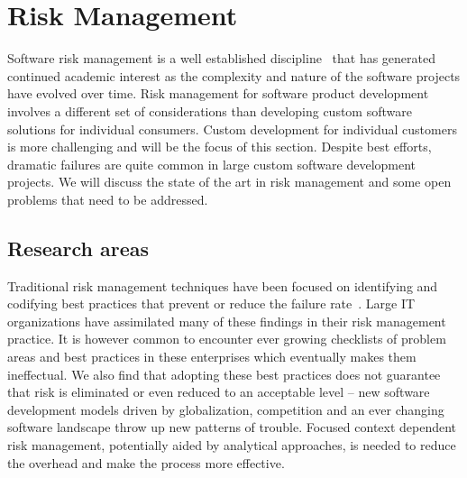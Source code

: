 \section{Risk Management}

Software risk management is a well established discipline~\cite{risk1,risk2} that has generated continued academic interest as the complexity and nature of the software projects have evolved over time. Risk management for software product development involves a different set of considerations than developing custom software solutions for individual consumers. Custom development for individual customers is more challenging and will be the focus of this section. Despite best efforts, dramatic failures are quite common in large custom software development projects. We will discuss the state of the art in risk management and some open problems that need to be addressed.

\subsection{Research areas}

Traditional risk management techniques have been focused on identifying and codifying best practices that prevent or reduce the failure rate~\cite{risk3,risk4,risk5}. Large IT organizations have assimilated many of these findings in their risk management practice.  It is however common to encounter ever growing checklists of problem areas and best practices in these enterprises which eventually makes them ineffectual. We also find that adopting these best practices does not guarantee that risk is eliminated or even reduced to an acceptable level -- new software development models driven by globalization, competition and an ever changing software landscape throw up new patterns of trouble. Focused context dependent risk management, potentially aided by analytical approaches, is needed to reduce the overhead and make the process more effective.

